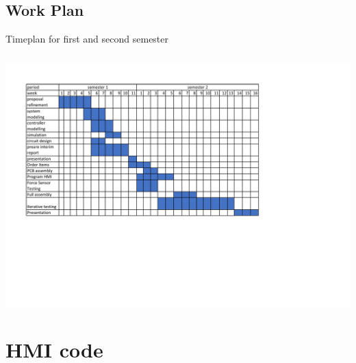  \section{Work Plan}
 \begin{center}
 \begin{table}[!h]
 \centering
 \caption[Timeplan]{Timeplan for first and second semester}
 \paragraph{ }
 \includegraphics[width=0.95\linewidth]{Figures/workplan}
 \end{table}
 \end{center}
\chapter{HMI code}
